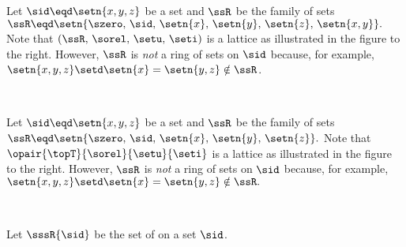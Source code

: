\begin{minipage}[c]{\tw-43mm}
\begin{example}
\label{ex:set_ring_progessive}
Let $\sid\eqd\setn{x,y,z}$ be a set
and $\ssR$ be the family of sets
  \\\indentx$\ssR\eqd\setn{\szero,\, \sid,\, \setn{x},\, \setn{y},\, \setn{z},\, \setn{x,y}}.$\\
Note that $(\ssR,\, \sorel,\, \setu,\, \seti)$ is a lattice as illustrated
in the figure to the right.
However, $\ssR$ is {\em not} a ring of sets on $\sid$ because, for example,
  \\\indentx$\setn{x,y,z} \setd \setn{x} = \setn{y,z}  \notin \ssR$.
\end{example}
\end{minipage}%
\hfill{}\hfill\mbox{}\\%

\begin{minipage}[c]{\tw-40mm}
\begin{example}
\label{ex:set_ring_primitive}
Let $\sid\eqd\setn{x,y,z}$ be a set
and $\ssR$ be the family of sets
  \\\indentx$\ssR\eqd\setn{\szero,\, \sid,\, \setn{x},\, \setn{y},\, \setn{z}}.$
Note that $\opair{\topT}{\sorel}{\setu}{\seti}$ is a lattice as illustrated
in the figure to the right.
However, $\ssR$ is {\em not} a ring of sets on $\sid$ because, for example,
  \\\indentx$\setn{x,y,z} \setd \setn{x} = \setn{y,z}  \notin \ssR.$
\end{example}
\end{minipage}%
\hfill{}\hfill\mbox{}\\%

\begin{proposition}
Let $\sssR{\sid}$ be the set of   on a set $\sid$.
\end{proposition}



